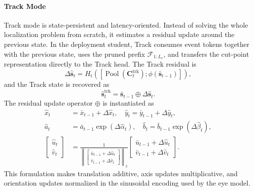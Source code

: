 \documentclass[journal]{IEEEtran}
\begin{document}
\paragraph*{Track Mode}
Track mode is state-persistent and latency-oriented. Instead of solving the whole localization problem from scratch, it estimates a residual update around the previous state. In the deployment student, Track consumes event tokens together with the previous state, uses the pruned prefix $\mathcal F_{1:L_c}$, and transfers the cut-point representation directly to the Track head. The Track residual is
\begin{equation}
\Delta \hat{\mathbf s}_t=
H_{\mathrm{t}}\!\left([\operatorname{Pool}(\mathbf C_t^{\mathrm{trk}});\phi(\bar{\mathbf s}_{t-1})]\right),
\end{equation}
and the Track state is recovered as
\begin{equation}
\hat{\mathbf s}_t^{\mathrm{trk}}=
\bar{\mathbf s}_{t-1}\oplus \Delta \hat{\mathbf s}_t.
\end{equation}
The residual update operator $\oplus$ is instantiated as
\begin{align}
\hat x_t &= \bar x_{t-1} + \Delta \hat x_t,\quad
\hat y_t = \bar y_{t-1} + \Delta \hat y_t,\\
\hat a_t &= \bar a_{t-1}\exp(\Delta \hat \alpha_t),\quad
\hat b_t = \bar b_{t-1}\exp(\Delta \hat \beta_t),\\
\begin{bmatrix}\hat u_t\\ \hat v_t\end{bmatrix}
&=
\frac{1}{\left\|\begin{bmatrix}\bar u_{t-1}+\Delta \hat u_t\\ \bar v_{t-1}+\Delta \hat v_t\end{bmatrix}\right\|_2}
\begin{bmatrix}\bar u_{t-1}+\Delta \hat u_t\\ \bar v_{t-1}+\Delta \hat v_t\end{bmatrix}.
\end{align}
This formulation makes translation additive, axis updates multiplicative, and orientation updates normalized in the sinusoidal encoding used by the eye model.
\end{document}

